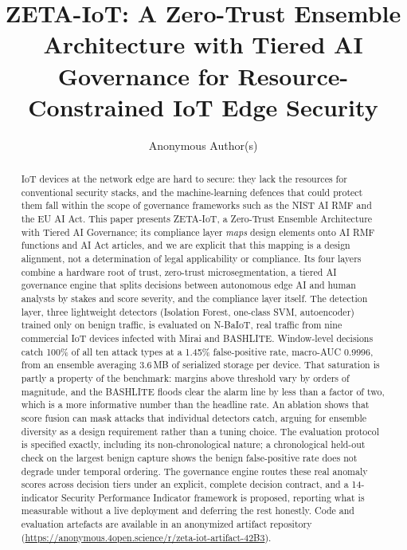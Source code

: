 \documentclass[sigconf,review,anonymous]{acmart}
\begin{document}
\title{ZETA-IoT: A Zero-Trust Ensemble Architecture with Tiered AI Governance for Resource-Constrained IoT Edge Security}

\author{Anonymous Author(s)}

\begin{abstract}
IoT devices at the network edge are hard to secure: they lack the resources for conventional security stacks, and the machine-learning defences that could protect them fall within the scope of governance frameworks such as the NIST AI RMF and the EU AI Act. This paper presents ZETA-IoT, a Zero-Trust Ensemble Architecture with Tiered AI Governance; its compliance layer \emph{maps} design elements onto AI RMF functions and AI Act articles, and we are explicit that this mapping is a design alignment, not a determination of legal applicability or compliance. Its four layers combine a hardware root of trust, zero-trust microsegmentation, a tiered AI governance engine that splits decisions between autonomous edge AI and human analysts by stakes and score severity, and the compliance layer itself. The detection layer, three lightweight detectors (Isolation Forest, one-class SVM, autoencoder) trained only on benign traffic, is evaluated on N-BaIoT, real traffic from nine commercial IoT devices infected with Mirai and BASHLITE. Window-level decisions catch 100\% of all ten attack types at a 1.45\% false-positive rate, macro-AUC 0.9996, from an ensemble averaging 3.6\,MB of serialized storage per device. That saturation is partly a property of the benchmark: margins above threshold vary by orders of magnitude, and the BASHLITE floods clear the alarm line by less than a factor of two, which is a more informative number than the headline rate. An ablation shows that score fusion can mask attacks that individual detectors catch, arguing for ensemble diversity as a design requirement rather than a tuning choice. The evaluation protocol is specified exactly, including its non-chronological nature; a chronological held-out check on the largest benign capture shows the benign false-positive rate does not degrade under temporal ordering. The governance engine routes these real anomaly scores across decision tiers under an explicit, complete decision contract, and a 14-indicator Security Performance Indicator framework is proposed, reporting what is measurable without a live deployment and deferring the rest honestly. Code and evaluation artefacts are available in an anonymized artifact repository (\url{https://anonymous.4open.science/r/zeta-iot-artifact-42B3}).
\end{abstract}
\end{document}

